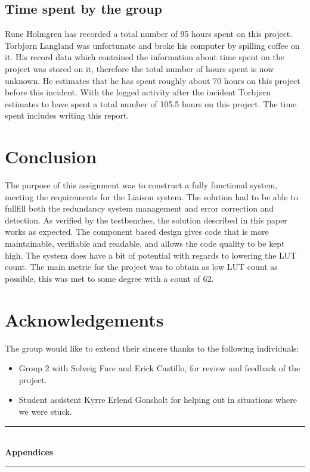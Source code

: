\documentclass[a4paper]{IEEEtran}
\begin{document}
\subsection{Time spent by the group}
Rune Holmgren has recorded a total number of 95 hours spent on this project.
\break
Torbjørn Langland was unfortunate and broke his computer by spilling coffee on it.
His record data which contained the information about time spent on the project was stored on it, therefore the total number of hours spent is now unknown.
He estimates that he has spent roughly about 70 hours on this project before this incident.
With the logged activity after the incident Torbjørn estimates to have spent a total number of 105.5 hours on this project.
The time spent includes writing this report.

\section{Conclusion}
The purpose of this assignment was to construct a fully functional system, meeting the requirements for the Liaison system.
The solution had to be able to fullfill both the redundancy system management and error correction and detection.
As verified by the testbenches, the solution described in this paper works as expected.
The component based design gives code that is more maintainable, verifiable and readable, and allows the code quality to be kept high.
The system does have a bit of potential with regards to lowering the LUT count.
The main metric for the project was to obtain as low LUT count as possible, this was met to some degree with a count of 62.

\section{Acknowledgements}
The group would like to extend their sincere thanks to the following individuals:
\begin{itemize}
    \item Group 2 with Solveig Fure and Erick Castillo, for review and feedback of the project.
    \item Student assistent Kyrre Erlend Gonsholt for helping out in situations where we were stuck.
\end{itemize}


\nocite{*}

\clearpage
\begin{titlepage}
    \newcommand{\HRule}{\rule{\linewidth}{0.5mm}} %
    \center %
    \vspace*{3cm}
    \HRule \\[0.4cm]
    { \huge \bfseries Appendices}\\[0.4cm] %
    \HRule \\[1.5cm]
\end{titlepage}
\clearpage
\end{document}
